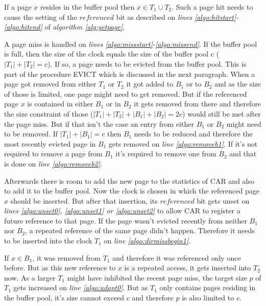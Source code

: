     If a page $x$ resides in the buffer pool then $x \in T_1 \cup T_2$. Such a page hit needs to cause the setting of the $referenced$ bit as described on \emph{lines \ref{algo:hitstart}-\ref{algo:hitend}} of \emph{algorithm \ref{alg:getpage}}.

    A page miss is handled on \emph{lines \ref{algo:missstart}-\ref{algo:missend}}. If the buffer pool is full, then the size of the clock equals the size of the buffer pool c ($\left|T_1\right| + \left|T_2\right| = c$). If so, a page needs to be evicted from the buffer pool. This is part of the procedure EVICT which is discussed in the next paragraph. When a page got removed from either $T_1$ or $T_2$ it got added to $B_1$ or to $B_2$ and as the size of those is limited, one page might need to get removed. But if the referenced page $x$ is contained in either $B_1$ or in $B_2$ it gets removed from there and therefore the size constraint of those ($\left|T_1\right| + \left|T_2\right| + \left|B_1\right| + \left|B_2\right| = 2c$) would still be met after the page miss. But if that isn't the case an entry from either $B_1$ or $B_2$ might need to be removed. If $\left|T_1\right| + \left|B_1\right| = c$ then $B_1$ needs to be reduced and therefore the most recently evicted page in $B_1$ gets removed on \emph{line \ref{algo:removeb1}}. If it's not required to remove a page from $B_1$ it's required to remove one from $B_2$ and that is done on \emph{line \ref{algo:removeb2}}.

    Afterwards there is room to add the new page to the statistics of CAR and also to add it to the buffer pool. Now the clock is chosen in which the referenced page $x$ should be inserted. But after that insertion, its $referenced$ bit gets unset on \emph{lines \ref{algo:unset0}, \ref{algo:unset1} or \ref{algo:unset2}} to allow CAR to register a future reference to that page. If the page wasn't evicted recently from neither $B_1$ nor $B_2$, a repeated reference of the same page didn't happen. Therefore it needs to be inserted into the clock $T_1$ on \emph{line \ref{algo:dirmissbegin1}}.

    If $x \in B_1$, it was removed from $T_1$ and therefore it was referenced only once before. But as this new reference to $x$ is a repeated access, it gets inserted into $T_2$ now. As a larger $T_1$ might have inhibited the recent page miss, the target size $p$ of $T_1$ gets increased on \emph{line \ref{algo:adapt0}}. But as $T_1$ only contains pages residing in the buffer pool, it's size cannot exceed $c$ and therefore $p$ is also limited to $c$.


